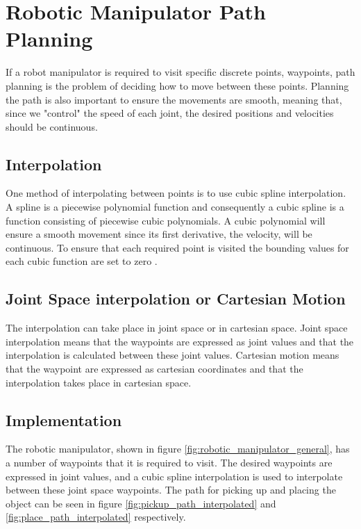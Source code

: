 \section*{Robotic Manipulator Path Planning} 



If a robot manipulator is required to visit specific discrete points, waypoints, path planning is the problem of deciding how to move between these points. Planning the path is also important to ensure the movements are smooth, meaning that, since we "control" the speed of each joint, the desired positions and velocities should be continuous.
\subsection*{Interpolation}
One method of interpolating between points is to use cubic spline interpolation. A spline \cite{spline_wolfram} is a piecewise polynomial function and consequently a cubic spline is a function consisting of piecewise cubic polynomials. A cubic polynomial will ensure a smooth movement since its first derivative, the velocity, will be continuous. To ensure that each required point is visited the bounding values for each cubic function are set to zero \cite{cubic_spline_wolfram}.

\subsection*{Joint Space interpolation or Cartesian Motion}
The interpolation can take place in joint space or in cartesian space. Joint space interpolation means that the waypoints are expressed as joint values and that the interpolation is calculated between these joint values. Cartesian motion means that the waypoint are expressed as cartesian coordinates and that the interpolation takes place in cartesian space.

\subsection*{Implementation} %
The robotic manipulator, shown in figure \ref{fig:robotic_manipulator_general}, has a number of waypoints that it is required to visit. The desired waypoints are expressed in joint values, and a cubic spline interpolation is used to interpolate between these joint space waypoints. The path for picking up and placing the object can be seen in figure \ref{fig:pickup_path_interpolated} and \ref{fig:place_path_interpolated} respectively.

